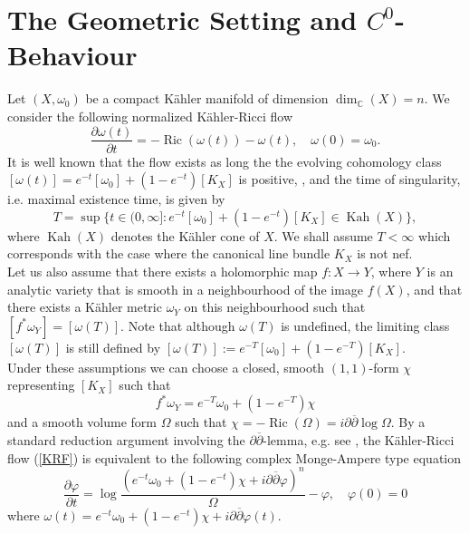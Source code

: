 \documentclass[12pt]{article}
\numberwithin{equation}{section}
\newcommand{\C}{\mathbb{C}}
\renewcommand{\d}{\partial}
\newcommand{\dbar}{\overline{\partial}}
\DeclareMathOperator{\Ric}{Ric}
\DeclareMathOperator{\Kah}{Kah}
\begin{document}
\section{The Geometric Setting and $C^0$-Behaviour}

Let $(X, \omega_0)$ be a compact K\"ahler manifold of dimension $\dim_\C(X) = n$. We consider the following normalized K\"ahler-Ricci flow
\begin{equation*}
    \frac{\d \omega(t)}{\d t} = -\Ric(\omega(t)) - \omega(t), \quad \omega(0) = \omega_0.
\end{equation*}
It is well known that the flow exists as long the the evolving cohomology class $[\omega(t)] = e^{-t}[\omega_0] + (1-e^{-t})[K_X]$ is positive, \cite{TZ06}, and the time of singularity, i.e. maximal existence time, is given by
\begin{equation*}
    T = \sup\{t\in (0,\infty]: e^{-t}[\omega_0] + (1-e^{-t})[K_X] \in \Kah(X)\},
\end{equation*}
where $\Kah(X)$ denotes the K\"ahler cone of $X$. We shall assume $T < \infty$ which corresponds with the case where the canonical line bundle $K_X$ is not nef.\\
Let us also assume that there exists a holomorphic map $f: X \to Y$, where $Y$ is an analytic variety that is smooth in a neighbourhood of the image $f(X)$, and that there exists a K\"ahler metric $\omega_Y$ on this neighbourhood such that $[f^*\omega_Y] = [\omega(T)]$. Note that although $\omega(T)$ is undefined, the limiting class $[\omega(T)]$ is still defined by $[\omega(T)] := e^{-T}[\omega_0] + (1-e^{-T})[K_X]$.\\
Under these assumptions we can choose a closed, smooth $(1,1)$-form $\chi$ representing $[K_X]$ such that 
\begin{equation*}
    f^* \omega_Y = e^{-T} \omega_0 + (1-e^{-T}) \chi
\end{equation*}
and a smooth volume form $\Omega$ such that $\chi = -\Ric(\Omega) = i\d\dbar \log \Omega$. By a standard reduction argument involving the $\d\dbar$-lemma, e.g. see \cite{Y78, TZ06}, the K\"ahler-Ricci flow (\ref{KRF}) is equivalent to the following complex Monge-Ampere type equation
\begin{equation}\label{nSKRF}\tag{SKRF}
    \frac{\d \varphi}{\d t} = \log \frac{(e^{-t}\omega_0 + (1-e^{-t})\chi + i \d\dbar \varphi)^n}{\Omega} - \varphi, \quad \varphi(0) = 0
\end{equation}
where $\omega(t) = e^{-t}\omega_0 + (1-e^{-t})\chi + i\d\dbar \varphi(t)$.
\end{document}
